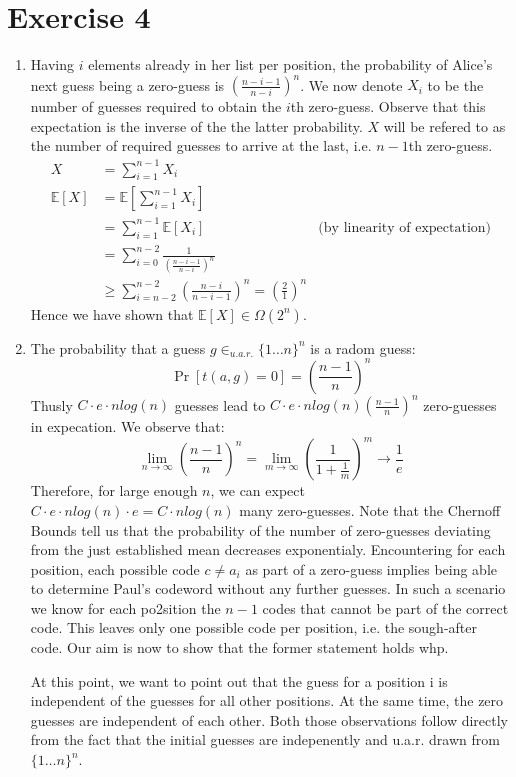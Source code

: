 \documentclass[a4paper,german]{article}
\begin{document}
\section*{Exercise 4}
\begin{enumerate}
\item
Having \(i\) elements already in her list per position, the probability of Alice's next guess being a zero-guess is \((\frac{n-i-1}{n-i})^n\). We now denote \(X_i \) to be the number of guesses required to obtain the \(i\)th zero-guess. Observe that this expectation is the inverse of the the latter probability. \(X\) will be refered to as the number of required guesses to arrive at the last, i.e. \(n-1\)th zero-guess.
\begin{align*}
X &= \sum_{i=1}^{n-1} X_i \\
\mathbb{E}[X] &= \mathbb{E}[\sum_{i=1}^{n-1} X_i ]\\
&= \sum_{i=1}^{n-1} \mathbb{E}[X_i] & \text{(by linearity of expectation)} \\
&= \sum_{i=0}^{n-2}\frac{1}{ (\frac{n-i-1}{n-i})^n}\\
&\geq \sum_{i=n-2}^{n-2} (\frac{n-i}{n-i-1})^n = (\frac{2}{1})^n
\end{align*}
Hence we have shown that \( \mathbb{E}[X] \in \Omega(2^n) \).


\item
The probability that a guess \(g \in_{u.a.r.} \{1 \dots  n\}^n\) is a radom guess:
$$ \Pr[t(a,g) = 0] = (\frac{n-1}{n})^n $$
Thusly \(C\cdot e \cdot nlog(n)\) guesses lead to \(C\cdot e \cdot nlog(n)  (\frac{n-1}{n})^n \) zero-guesses in expecation. We observe that:
$$ \lim_{n \to \infty}  (\frac{n-1}{n})^n =  \lim_{m \to \infty}  (\frac{1}{1 + \frac{1}{m}})^m \to \frac{1}{e}$$
Therefore, for large enough \(n\), we can expect  \(C\cdot e \cdot nlog(n)  \cdot e  = C \cdot nlog(n)\) many zero-guesses.  Note that the Chernoff Bounds tell us that the probability of the number of zero-guesses deviating from the just established mean decreases exponentialy.
Encountering for each position, each possible code \(c \neq a_i\) as part of a zero-guess implies being able to determine Paul's codeword without any further guesses. In such a scenario we know for each po2sition the \(n-1\) codes that cannot be part of the correct code. This leaves only one possible code per position, i.e. the sough-after code. Our aim is now to show that the former statement holds whp.

At this point, we want to point out that the guess for a position i is independent of the guesses for all other positions. At the same time, the zero guesses are independent of each other. Both those observations follow directly from the fact that the initial guesses are indepenently and u.a.r. drawn from \(\{1\dots n\}^n\).


\end{enumerate}
\end{document}
